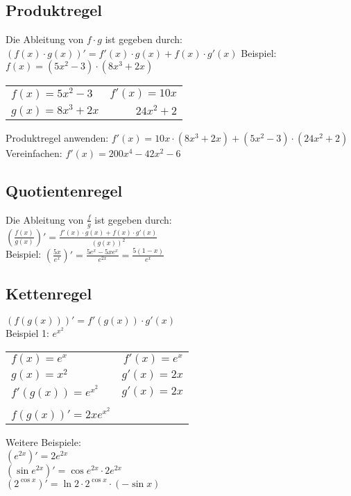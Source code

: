 \documentclass[a4paper, 12pt]{article}
\begin{document}
\subsection{Produktregel}
Die Ableitung von $f \cdot g$ ist gegeben durch: \newline
\newline $(f(x) \cdot g(x))' = f'(x) \cdot g(x) + f(x) \cdot g'(x)$\newline
\newline Beispiel: $f(x) = (5x^2 - 3) \cdot (8x^3+2x)$

\begin{tabular}{l r}
	$f(x) = 5x^2 - 3$ & $f'(x) = 10x$\\
	$g(x)=8x^3+2x$ & $24x^2 + 2$\\
\end{tabular} \newline
\newline Produktregel anwenden: 
\newline $f'(x)=10x \cdot (8x^3+2x) + (5x^2-3) \cdot (24x^2+2)$ \newline
\newline Vereinfachen: $f'(x) = 200x^4-42x^2-6$

\subsection{Quotientenregel}

Die Ableitung von $\frac{f}{g}$ ist gegeben durch: \\
\newline $(\frac{f(x)}{g(x)})' = \frac{f'(x) \cdot g(x) + f(x) \cdot
g'(x)}{(g(x))^2}$ \\

Beispiel: $(\frac{5x}{e^x})' = \frac{5e^x-5xe^x}{e^{2x}} = \frac{5(1-x)}{e^x}$

\subsection{Kettenregel}

$(f(g(x)))' = f'(g(x)) \cdot g'(x)$\\
\newline Beispiel 1: $e^{x^{2}}$\\ 
\begin{tabular}{l r}
	$f(x)=e^x$ & $f'(x)=e^x$\\
	$g(x)=x^2$ & $g'(x)=2x$\\
	$f'(g(x))=e^{x^{2}}$ & $g'(x)=2x$\\
	 & \\
	$f(g(x))'=2xe^{x^{2}}$
\end{tabular} \newline
\newline Weitere Beispiele: \\
$(e^{2x})' = 2e^{2x}$\\
$(\sin{e^{2x}})' = \cos{e^{2x}} \cdot 2e^{2x}$\\
$(2^{\cos{x}})'=\ln{2} \cdot 2^{\cos{x}} \cdot (-\sin{x})$
\end{document}
